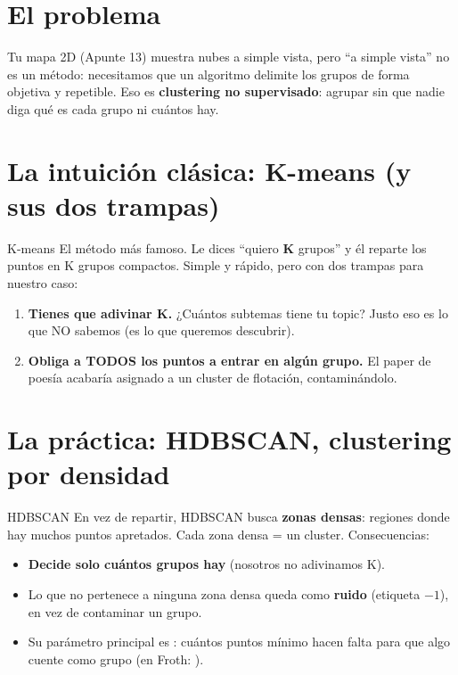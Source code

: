 \documentclass[11pt,a4paper]{article}
\begin{document}

\section{El problema}

Tu mapa 2D (Apunte 13) muestra nubes a simple vista, pero ``a simple vista'' no es un método:
necesitamos que un algoritmo delimite los grupos de forma objetiva y repetible. Eso es
\textbf{clustering no supervisado}: agrupar sin que nadie diga qué es cada grupo ni cuántos hay.

\section{La intuición clásica: K-means (y sus dos trampas)}

\begin{concepto}{K-means}
El método más famoso. Le dices ``quiero \textbf{K} grupos'' y él reparte los puntos en K
grupos compactos. Simple y rápido, pero con dos trampas para nuestro caso:
\begin{enumerate}
  \item \textbf{Tienes que adivinar K.} ¿Cuántos subtemas tiene tu topic? Justo eso es lo que
        NO sabemos (es lo que queremos descubrir).
  \item \textbf{Obliga a TODOS los puntos a entrar en algún grupo.} El paper de poesía
        acabaría asignado a un cluster de flotación, contaminándolo.
\end{enumerate}
\end{concepto}

\section{La práctica: HDBSCAN, clustering por densidad}

\begin{concepto}{HDBSCAN}
En vez de repartir, HDBSCAN busca \textbf{zonas densas}: regiones donde hay muchos puntos
apretados. Cada zona densa = un cluster. Consecuencias:
\begin{itemize}
  \item \textbf{Decide solo cuántos grupos hay} (nosotros no adivinamos K).
  \item Lo que no pertenece a ninguna zona densa queda como \textbf{ruido} (etiqueta $-1$),
        en vez de contaminar un grupo.
  \item Su parámetro principal es : cuántos puntos mínimo hacen
        falta para que algo cuente como grupo (en Froth: ).
\end{itemize}
\end{concepto}
\end{document}
